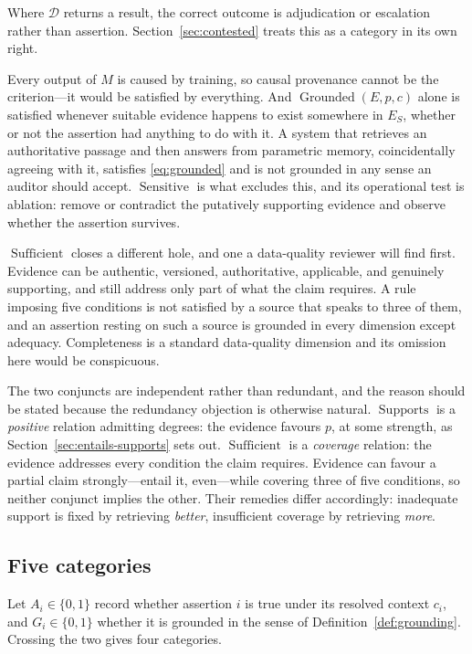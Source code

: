 \documentclass[11pt]{article}
\newcommand{\Supports}{\operatorname{Supports}}
\newcommand{\Grounded}{\operatorname{Grounded}}
\newcommand{\Sensitive}{\operatorname{Sensitive}}
\newcommand{\Sufficient}{\operatorname{Sufficient}}
\newcommand{\DefeaterSearch}{\mathcal{D}}
\theoremstyle{plain}
\theoremstyle{definition}
\begin{document}
Where $\DefeaterSearch$ returns a result, the correct outcome is adjudication or
escalation rather than assertion. Section~\ref{sec:contested} treats this as a category
in its own right.

Every output of $M$ is caused by training, so causal provenance cannot be the
criterion---it would be satisfied by everything. And $\Grounded(E, p, c)$ alone is
satisfied whenever suitable evidence happens to exist somewhere in $E_S$, whether
or not the assertion had anything to do with it. A system that retrieves an
authoritative passage and then answers from parametric memory, coincidentally
agreeing with it, satisfies \eqref{eq:grounded} and is not grounded in any sense
an auditor should accept. $\Sensitive$ is what excludes this, and its operational
test is ablation: remove or contradict the putatively supporting evidence and
observe whether the assertion survives.

$\Sufficient$ closes a different hole, and one a data-quality reviewer will find
first. Evidence can be authentic, versioned, authoritative, applicable, and genuinely
supporting, and still address only part of what the claim requires. A rule imposing
five conditions is not satisfied by a source that speaks to three of them, and an
assertion resting on such a source is grounded in every dimension except adequacy.
Completeness is a standard data-quality dimension and its omission here would be
conspicuous.

The two conjuncts are independent rather than redundant, and the reason should be
stated because the redundancy objection is otherwise natural. $\Supports$ is a
\emph{positive} relation admitting degrees: the evidence favours $p$, at some strength,
as Section~\ref{sec:entails-supports} sets out. $\Sufficient$ is a \emph{coverage}
relation: the evidence addresses every condition the claim requires. Evidence can favour
a partial claim strongly---entail it, even---while covering three of five conditions, so
neither conjunct implies the other. Their remedies differ accordingly: inadequate support
is fixed by retrieving \emph{better}, insufficient coverage by retrieving \emph{more}.

\subsection{Five categories}

Let $A_i \in \{0,1\}$ record whether assertion $i$ is true under its resolved
context $c_i$, and $G_i \in \{0,1\}$ whether it is grounded in the sense of
Definition~\ref{def:grounding}. Crossing the two gives four categories.
\end{document}
